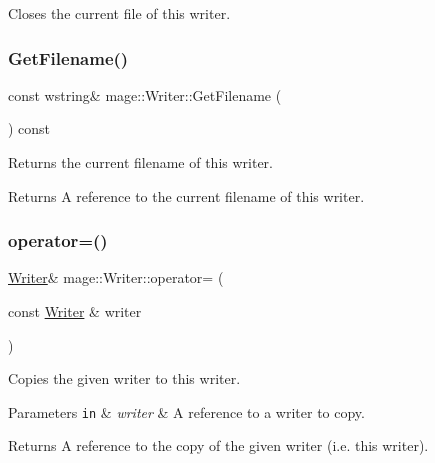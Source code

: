 Closes the current file of this writer. \hypertarget{classmage_1_1_writer_aa874f2ee6cdd6663078d213f10d984f1}{}\label{classmage_1_1_writer_aa874f2ee6cdd6663078d213f10d984f1} 
\subsubsection{\texorpdfstring{Get\+Filename()}{GetFilename()}}
{\footnotesize\ttfamily const wstring\& mage\+::\+Writer\+::\+Get\+Filename (\begin{DoxyParamCaption}{ }\end{DoxyParamCaption}) const}

Returns the current filename of this writer.

\begin{DoxyReturn}{Returns}
A reference to the current filename of this writer. 
\end{DoxyReturn}
\hypertarget{classmage_1_1_writer_a81ea888d1b170515713432ca28629ceb}{}\label{classmage_1_1_writer_a81ea888d1b170515713432ca28629ceb} 
\subsubsection{\texorpdfstring{operator=()}{operator=()}\hspace{0.1cm}{\footnotesize\ttfamily [1/2]}}
{\footnotesize\ttfamily \hyperlink{classmage_1_1_writer}{Writer}\& mage\+::\+Writer\+::operator= (\begin{DoxyParamCaption}\item[{const \hyperlink{classmage_1_1_writer}{Writer} \&}]{writer }\end{DoxyParamCaption})\hspace{0.3cm}{\ttfamily [delete]}}

Copies the given writer to this writer.


\begin{DoxyParams}[1]{Parameters}
\mbox{\tt in}  & {\em writer} & A reference to a writer to copy. \\
\hline
\end{DoxyParams}
\begin{DoxyReturn}{Returns}
A reference to the copy of the given writer (i.\+e. this writer). 
\end{DoxyReturn}
\hypertarget{classmage_1_1_writer_aefbdd9a659983b543358cc8277ab890c}{}\label{classmage_1_1_writer_aefbdd9a659983b543358cc8277ab890c} 
